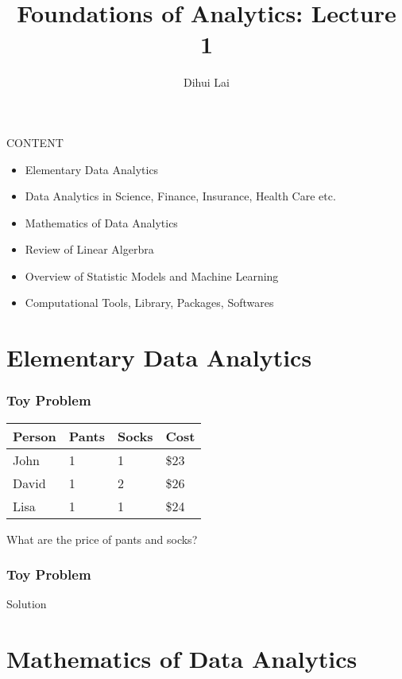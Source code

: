 \documentclass[notheorems, aspectratio=54]{beamer}
\title{Foundations of Analytics: Lecture 1}
\author{Dihui Lai}
\institute[WUSTL]{dlai@wustl.edu}
\begin{document}
\begin{frame}
    \titlepage
\end{frame}

\begin{frame}
CONTENT
\begin{itemize}
\item Elementary Data Analytics
\item Data Analytics in Science, Finance, Insurance, Health Care etc. 
\item Mathematics of Data Analytics
\item Review of Linear Algerbra 
\item Overview of Statistic Models and Machine Learning
\item Computational Tools, Library, Packages, Softwares
\end{itemize}
\end{frame}

\section{Elementary Data Analytics}
\begin{frame}
\frametitle{Toy Problem}
\begin{table}[]
\begin{tabular}{llll}
Person &Pants & Socks &Cost\\
\hline
John	&1	&1  &\$23\\
David	&1	&2  &\$26\\
Lisa	&1	&1  &\$24\\
\hline
\end{tabular}
\end{table}
What are the price of pants and socks?
\end{frame}


\begin{frame}
\frametitle{Toy Problem}
\begin{center}
Solution
\end{center}

\end{frame}


\section{Mathematics of Data Analytics}
\end{document}
